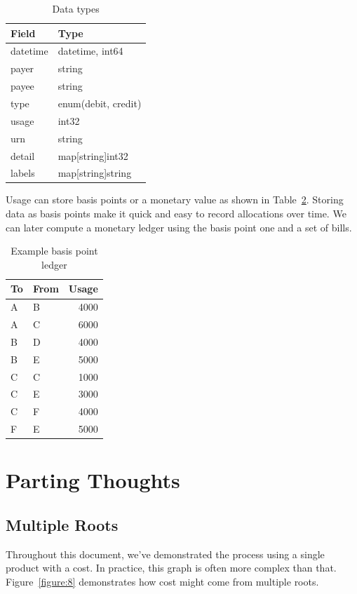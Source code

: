 \documentclass[10pt, a4paper, twocolumn]{article}
\begin{document}
    \begin{table}[H]
      \centering
      \begin{tabular}{ l|l }
        Field & Type \\
        \hline
        datetime & datetime, int64 \\
        payer & string \\
        payee & string \\
        type & enum(debit, credit) \\
        usage & int32 \\
        urn & string \\
        detail & map[string]int32 \\
        labels & map[string]string \\
      \end{tabular}
      \caption{Data types}
      \label{table:4}
    \end{table}

    Usage can store basis points or a monetary value as shown in Table~\ref{table:5}.
    Storing data as basis points make it quick and easy to record allocations over time.
    We can later compute a monetary ledger using the basis point one and a set of bills.

    \begin{table}[H]
      \centering
      \begin{tabular}{ l|l|r }
        To & From & Usage \\
        \hline
        A & B & 4000 \\
        A & C & 6000 \\
        B & D & 4000 \\
        B & E & 5000 \\
        C & C & 1000 \\
        C & E & 3000 \\
        C & F & 4000 \\
        F & E & 5000 \\
      \end{tabular}
      \caption{Example basis point ledger}
      \label{table:5}
    \end{table}


\section*{Parting Thoughts}

  \subsection*{Multiple Roots}
    Throughout this document, we've demonstrated the process using a single product with a cost.
    In practice, this graph is often more complex than that.
    Figure~\ref{figure:8} demonstrates how cost might come from multiple roots.
\end{document}
